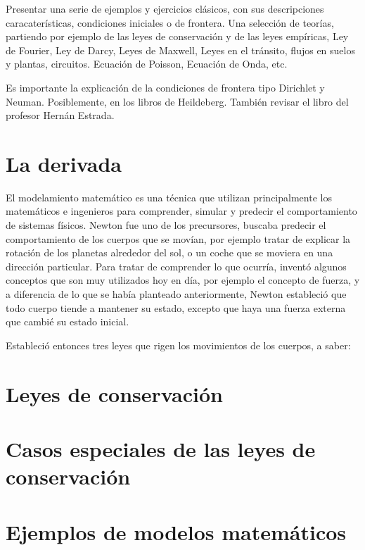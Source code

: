 Presentar una serie de ejemplos y ejercicios clásicos, con sus descripciones
caracaterísticas, condiciones iniciales o de frontera.  Una selección 
de teorías, partiendo por ejemplo de las leyes de conservación y de las 
leyes empíricas, Ley de Fourier, Ley de Darcy, Leyes de Maxwell, Leyes 
en el tránsito, flujos en suelos y plantas, circuitos.
Ecuación de Poisson, Ecuación de Onda, etc.

Es importante la explicación de la condiciones de frontera tipo Dirichlet y Neuman.
Posiblemente, en los libros de Heildeberg. También revisar el libro del profesor 
Hernán Estrada.

\section{La derivada}
El modelamiento matemático es una técnica que utilizan principalmente los matemáticos e ingenieros 
para comprender, simular y predecir el comportamiento de sistemas físicos.  Newton fue uno de 
los precursores, buscaba predecir el comportamiento de los cuerpos que se movían, por ejemplo
tratar de explicar la rotación de los planetas alrededor del sol, o un coche que se moviera en una 
dirección particular.  Para tratar de comprender lo que ocurría, inventó algunos conceptos que son 
muy utilizados hoy en día, por ejemplo el concepto de fuerza, y a diferencia de lo que se había planteado
anteriormente, Newton estableció que todo cuerpo tiende a mantener su estado, excepto que haya una
fuerza externa que cambié su estado inicial.  

Estableció entonces tres leyes que rigen los movimientos de los cuerpos, a saber:

\section{Leyes de conservación}

\section{Casos especiales de las leyes de conservación}

\section{Ejemplos de modelos matemáticos}


